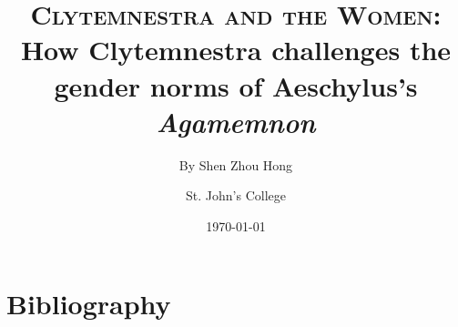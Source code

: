 \documentclass[12pt, letter, final, onecolumn, notitlepage]{article}
\title{
    \textbf{\textsc{Clytemnestra and the Women}}:
    \\ How Clytemnestra challenges the gender norms of Aeschylus's \emph{Agamemnon}
}
\author{By Shen Zhou Hong \and St. John's College}
\date{\today}
\begin{document}
\maketitle



\clearpage
\nocite{*}
\section*{Bibliography}
\printbibliography[heading=none]

\end{document}
